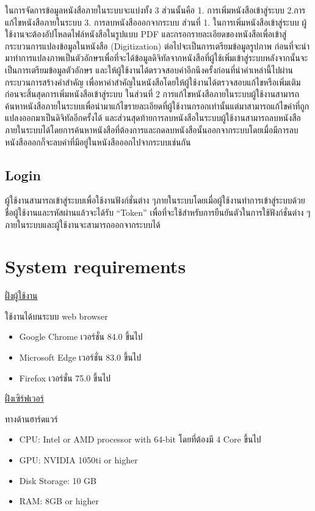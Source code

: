 ในการจัดการข้อมูลหนังสือภายในระบบจะแบ่งทั้ง 3 ส่วนนั้นคือ 1. การเพิ่มหนังสือเข้าสู่ระบบ 2.การแก้ไขหนังสือภายในระบบ  3. การลบหนังสือออกจากระบบ 
ส่วนที่ 1. ในการเพิ่มหนังสือเข้าสู่ระบบ ผู้ใช้งานจะต้องอัปโหลดไฟล์หนังสือในรูปแบบ PDF และกรอกรายละเอียดของหนังสือเพื่อเข้าสู่กระบวนการแปลงข้อมูลในหนังสือ (Digitization) ต่อไปจะเป็นการเตรียมข้อมูลรูปภาพ ก่อนที่จะนำมาทำการแปลงภาพเป็นตัวอักษรเพื่อที่จะได้ข้อมูลดิจิทัลจากหนังสือที่ผู้ใช้เพิ่มเข้าสู่ระบบหลังจากนั้นจะเป็นการเตรียมข้อมูลตัวอักษร 
และให้ผู้ใช้งานได้ตรวจสอบคำอีกนึงครั้งก่อนที่นำคำเหล่านี้ไปผ่านกระบวนการสร้างคำสำคัญ เพื่อหาคำสำคัญในหนังสือโดยให้ผู้ใช้งานได้ตรวจสอบแก้ไขหรือเพิ่มเติมก่อนจะสิ้นสุดการเพิ่มหนังสือเข้าสู่ระบบ ในส่วนที่ 2 การแก้ไขหนังสือภายในระบบผู้ใช้งานสามารถค้นหาหนังสือภายในระบบเพื่อนำมาแก้ไขรายละเอียดที่ผู้ใช้งานกรอกเท่านั้นแต่มาสามารถแก้ไขคำที่ถูกแปลงออกมาเป็นดิจิทัลอีกครั้งได้ และส่วนสุดท้ายการลบหนังสือในระบบผู้ใช้งานสามารถลบหนังสือภายในระบบได้โดยการค้นหาหนังสือที่ต้องการและกดลบหนังสือนั้นออกจากระบบโดยเมื่อมีการลบหนังสือออกก็จะลบคำที่มีอยู่ในหนังสือออกไปจากระบบเช่นกัน

\subsection{Login}

ผู้ใช้งานสามารถเข้าสู่ระบบเพื่อใช้งานฟังก์ชั่นต่าง ๆภายในระบบโดยเมื่อผู้ใช้งานทำการเข้าสู่ระบบด้วยชื่อผู้ใช้งานและรหัสผ่านแล้วจะได้รับ “Token” เพื่อที่จะใช้สำหรับการยืนยันตัวในการใช้ฟังก์ชั่นต่าง ๆภายในระบบและผู้ใช้งานจะสามารถออกจากระบบได้

\section{System requirements}

\underline{ฝั่งผู้ใช้งาน}

ใช้งานได้บนระบบ web browser 

\begin{itemize}
    \item Google Chrome เวอร์ชั่น 84.0 ขึ้นไป 
    \item Microsoft Edge เวอร์ชั่น 83.0 ขึ้นไป
    \item Firefox เวอร์ชั่น 75.0 ขึ้นไป
\end{itemize}
 
\underline{ฝั่งเซิร์ฟเวอร์}
		
ทางด้านฮาร์ดแวร์

        \begin{itemize}
            \item CPU: Intel or AMD processor with 64-bit โดยที่ต้องมี 4 Core ขึ้นไป
            \item GPU: NVIDIA 1050ti or higher
            \item Disk Storage: 10 GB
            \item RAM: 8GB or higher
        \end{itemize}
        
